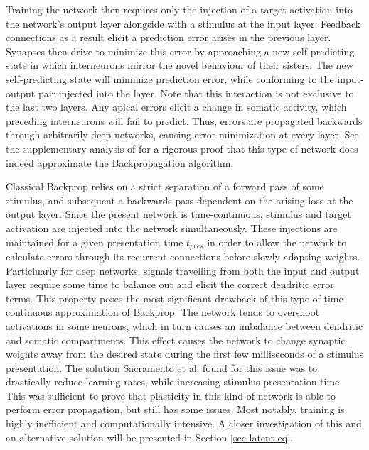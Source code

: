 Training the network then requires only the injection of a target activation into the network's output layer alongside
with a stimulus at the input layer. Feedback connections as a result elicit a prediction error arises in the previous
layer. Synapses then drive to minimize this error by approaching a new self-predicting state in which interneurons
mirror the novel behaviour of their sisters. The new self-predicting state will minimize prediction error, while
conforming to the input-output pair injected into the layer. Note that this interaction is not exclusive to the last two
layers. Any apical errors elicit a change in somatic activity, which preceding interneurons will fail to predict. Thus,
errors are propagated backwards through arbitrarily deep networks, causing error minimization at every layer. See the
supplementary analysis of \citep{sacramento2018dendritic} for a rigorous proof that this type of network does indeed
approximate the Backpropagation algorithm.



Classical Backprop relies on a strict separation of a forward pass of some stimulus, and subsequent a backwards pass
dependent on the arising loss at the output layer. Since the present network is time-continuous, stimulus and target
activation are injected into the network simultaneously. These injections are maintained for a given presentation time
$t_{pres}$ in order to allow the network to calculate errors through its recurrent connections before slowly adapting
weights. Particluarly for deep networks, signals travelling from both the input and output layer require some time to
balance out and elicit the correct dendritic error terms. This property poses the most significant drawback of this type
of time-continuous approximation of Backprop: The network tends to overshoot activations in some neurons, which in turn
causes an imbalance between dendritic and somatic compartments. This effect causes the network to change synaptic
weights away from the desired state during the first few milliseconds of a stimulus presentation. The solution
Sacramento et al. found for this issue was to drastically reduce learning rates, while increasing stimulus presentation
time. This was sufficient to prove that plasticity in this kind of network is able to perform error propagation, but
still has some issues. Most notably, training is highly inefficient and computationally intensive. A closer
investigation of this and an alternative solution will be presented in Section \ref{sec-latent-eq}.



